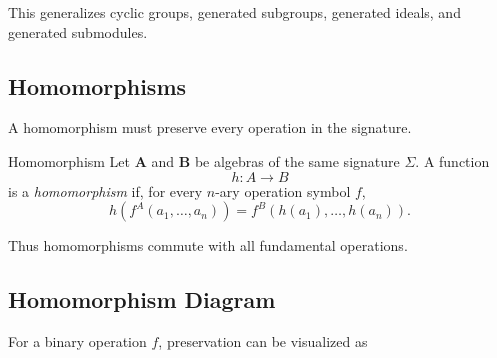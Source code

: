 \begin{center}
\end{center}

This generalizes cyclic groups, generated subgroups, generated ideals, and
generated submodules.

\subsection{Homomorphisms}
\label{subsec:universal-homomorphisms}

A homomorphism must preserve every operation in the signature.

\begin{definitionbox}{Homomorphism}
Let \(\mathbf A\) and \(\mathbf B\) be algebras of the same signature
\(\Sigma\). A function
\[ h:A\to B \]
is a \emph{homomorphism} if, for every \(n\)-ary operation symbol \(f\),
\[ h\!\left(f^A(a_1,\ldots,a_n)\right)
=f^B\!\left(h(a_1),\ldots,h(a_n)\right). \]
\end{definitionbox}

Thus homomorphisms commute with all fundamental operations.

\subsection{Homomorphism Diagram}
\label{subsec:universal-homomorphism-diagram}

For a binary operation \(f\), preservation can be visualized as

\begin{center}
\end{center}

